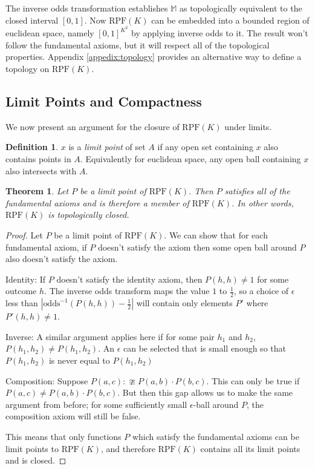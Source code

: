\documentclass[twoside]{article}
\theoremstyle{plain}%
\newtheorem{theorem}{Theorem}[section]
\theoremstyle{definition}
\newtheorem{definition}{Definition}[section]
\theoremstyle{remark}
\begin{document}
The inverse odds transformation establishes \(\mathbb{M}\) as topologically equivalent to the closed interval \([0, 1]\). Now \(\text{RPF}(K)\) can be embedded into a bounded region of euclidean space, namely \([0, 1]^{K^2}\) by applying inverse odds to it. The result won't follow the fundamental axioms, but it will respect all of the topological properties. Appendix \ref{appedix:topology} provides an alternative way to define a topology on \(\text{RPF}(K)\).

\subsection{Limit Points and Compactness}

We now present an argument for the closure of \(\text{RPF}(K)\) under limits.

\begin{definition}
\(x\) is a \textit{limit point} of set \(A\) if any open set containing \(x\) also contains points in \(A\). Equivalently for euclidean space, any open ball containing \(x\) also intersects with \(A\).
\end{definition}

\begin{theorem}
\label{thm:rpf_closed}
Let \(P\) be a \textit{limit point} of \(\text{RPF}(K)\). Then \(P\) satisfies all of the fundamental axioms and is therefore a member of \(\text{RPF}(K)\). In other words, \(\text{RPF}(K)\) is topologically closed.
\end{theorem}

\begin{proof}
Let \(P\) be a limit point of \(\text{RPF}(K)\). We can show that for each fundamental axiom, if \(P\) doesn't satisfy the axiom then some open ball around \(P\) also doesn't satisfy the axiom.

Identity: If \(P\) doesn't satisfy the identity axiom, then \(P(h, h) \neq 1\) for some outcome \(h\). The inverse odds transform maps the value \(1\) to \(\frac{1}{2}\), so a choice of \(\epsilon\) less than \(|\text{odds}^{-1}(P(h, h)) - \frac{1}{2}|\) will contain only elements \(P'\) where \(P'(h, h) \neq 1\).

Inverse: A similar argument applies here if for some pair \(h_1\) and \(h_2\), \(P(h_1, h_2) \neq P(h_1, h_2)\). An \(\epsilon\) can be selected that is small enough so that \(P(h_1, h_2)\) is never equal to \(P(h_1, h_2)\)

Composition: Suppose \(P(a, c) :\ncong P(a, b) \cdot P(b, c) \). This can only be true if \(P(a, c) \neq P(a, b) \cdot P(b, c) \). But then this gap allows us to make the same argument from before; for some sufficiently small \(\epsilon\)-ball around \(P\), the composition axiom will still be false.

This means that only functions \(P\) which satisfy the fundamental axioms can be limit points to \(\text{RPF}(K)\), and therefore \(\text{RPF}(K)\) contains all its limit points and is closed.
\end{proof}
\end{document}
